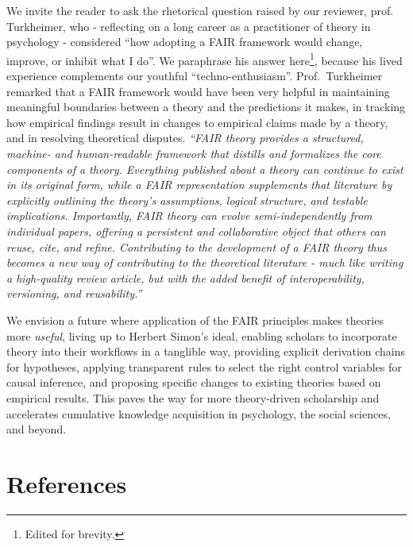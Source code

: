 \documentclass[
  man, noextraspace,floatsintext]{apa7}
\begin{document}
\label{turkheimer}{We invite the reader to ask the rhetorical question raised by our reviewer, prof. Turkheimer, who - reflecting on a long career as a practitioner of theory in psychology - considered ``how adopting a FAIR framework would change, improve, or inhibit what I do''.
We paraphrase his answer here\footnote{Edited for brevity.}, because his lived experience complements our youthful ``techno-enthusiasm''.
Prof.~Turkheimer remarked that a FAIR framework would have been very helpful in maintaining meaningful boundaries between a theory and the predictions it makes,
in tracking how empirical findings result in changes to empirical claims made by a theory,
and in resolving theoretical disputes.
\emph{``FAIR theory provides a structured, machine- and human-readable framework that distills and formalizes the core components of a theory.
Everything published about a theory can continue to exist in its original form,
while a FAIR representation supplements that literature by explicitly outlining the theory's assumptions, logical structure, and testable implications.
Importantly, FAIR theory can evolve semi-independently from individual papers, offering a persistent and collaborative object that others can reuse, cite, and refine.
Contributing to the development of a FAIR theory thus becomes a new way of contributing to the theoretical literature - much like writing a high-quality review article, but with the added benefit of interoperability, versioning, and reusability.''}}

We envision a future where application of the FAIR principles makes theories more \emph{useful}, living up to Herbert Simon's ideal,
enabling scholars to incorporate theory into their workflows in a tanglible way,
providing explicit derivation chains for hypotheses,
applying transparent rules to select the right control variables for causal inference,
and proposing specific changes to existing theories based on empirical results.
This paves the way for more theory-driven scholarship
and accelerates cumulative knowledge acquisition in psychology, the social sciences, and beyond.

\newpage

\section{References}\label{references}
\end{document}
